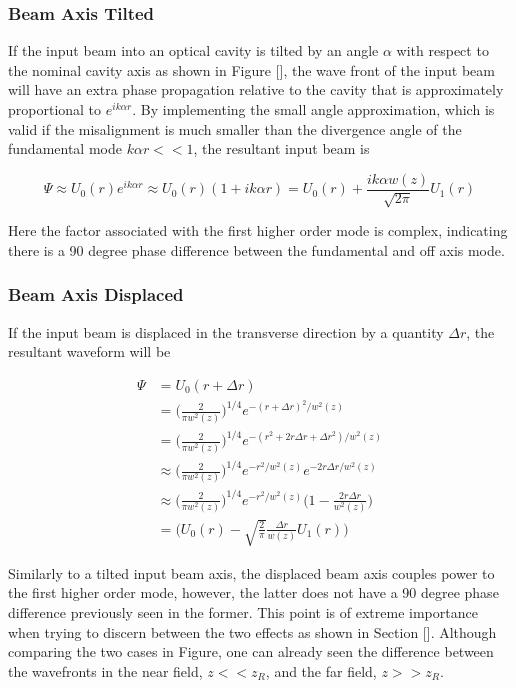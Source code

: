 \documentclass[oneside]{book}
\begin{document}
		
		\subsubsection{Beam Axis Tilted}
		If the input beam into an optical cavity is tilted by an angle $\alpha$ with respect to the nominal cavity axis as shown in Figure [], the wave front of the input beam will have an extra phase propagation relative to the cavity that is approximately proportional to $e^{ik \alpha r}$.  By implementing the small angle approximation, which is valid if the misalignment is much smaller than the divergence angle of the fundamental mode $k \alpha r << 1$, the resultant input beam is
		
		\begin{equation}
		\Psi \approx U_{0}(r) e^{ik \alpha r} \approx U_{0}(r) ( 1 + ik \alpha r ) =  U_{0}(r) + \frac{ik \alpha w(z)}{\sqrt{2\pi}} U_{1}(r)
		\end{equation}
		
		Here the factor associated with the first higher order mode is complex, indicating there is a 90 degree phase difference between the fundamental and off axis mode. 
		\subsubsection{Beam Axis Displaced}
		If the input beam is displaced in the transverse direction by a quantity $\Delta r$, the resultant waveform will be
		
		\begin{equation}
		\begin{aligned}
			\Psi 	&=  		U_{0}(r + \Delta r	) 
			\\		&= 			\bigg( \frac{2}{\pi w^2(z)} \bigg)^{1/4}  e^{-(r+\Delta r)^2/w^2(z)}
			\\		&= 			\bigg( \frac{2}{\pi w^2(z)} \bigg)^{1/4}  e^{-(r^2 + 2r \Delta r  + \Delta r^2)/w^2(z)}
			\\		&\approx 	\bigg( \frac{2}{\pi w^2(z)} \bigg)^{1/4}  e^{-r^2/w^2(z)} e^{-2r \Delta r/w^2(z)}
			\\		&\approx 	\bigg( \frac{2}{\pi w^2(z)} \bigg)^{1/4}  e^{-r^2/w^2(z)} \bigg(1 - \frac{2r \Delta r}{w^2(z)} \bigg)
			\\		&=			\bigg( U_0(r) - \sqrt{\frac{2}{\pi}} \frac{\Delta r }{w(z)} U_1(r)	 \bigg)
		\end{aligned}
		\end{equation} 
		
		Similarly to a tilted input beam axis, the displaced beam axis couples power to the first higher order mode, however, the latter does not have a 90 degree phase difference previously seen in the former.  This point is of extreme importance when trying to discern between the two effects as shown in Section [].  Although comparing the two cases in Figure, one can already seen the difference between the wavefronts in the near field, $z<<z_R$, and the far field, $z>>z_R$.  
		
\end{document}
